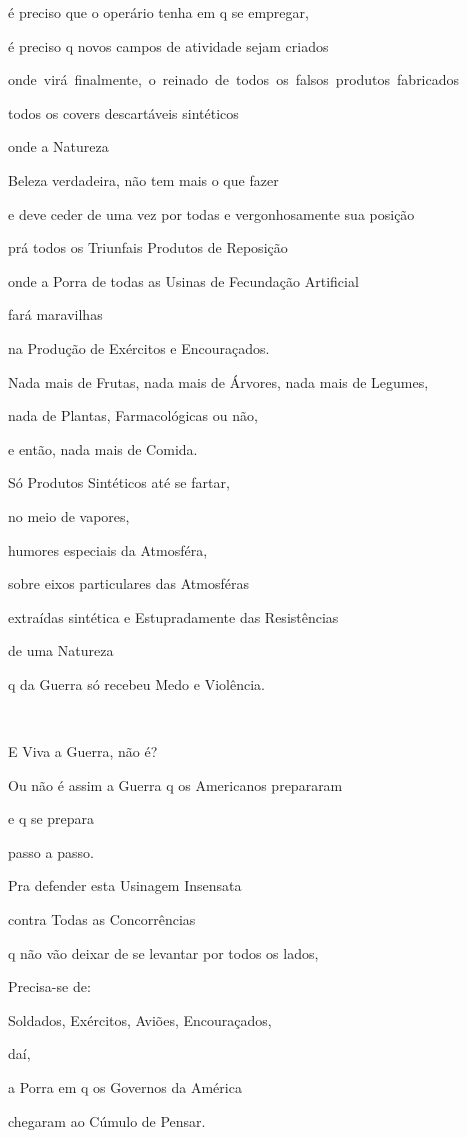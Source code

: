 é preciso que o operário tenha em q se empregar,

é preciso q novos campos de atividade sejam criados

\mbox{onde virá finalmente, o reinado de todos os falsos produtos fabricados}

todos os covers descartáveis sintéticos

onde a Natureza

Beleza verdadeira, não tem mais o que fazer

e deve ceder de uma vez por todas e vergonhosamente sua posição

prá todos os Triunfais Produtos de Reposição

onde a Porra de todas as Usinas de Fecundação Artificial

fará maravilhas

na Produção de Exércitos e Encouraçados.

Nada mais de Frutas, nada mais de Árvores, nada mais de Legumes,

nada de Plantas, Farmacológicas ou não,

e então, nada mais de Comida.

Só Produtos Sintéticos até se fartar, 

no meio de vapores,

humores especiais da Atmosféra, 

sobre eixos particulares das Atmosféras

extraídas sintética e Estupradamente das Resistências

de uma Natureza

q da Guerra só recebeu Medo e Violência.

~

E Viva a Guerra, não é?

Ou não é assim a Guerra q os Americanos prepararam

e q se prepara

passo a passo.

Pra defender esta Usinagem Insensata

contra Todas as Concorrências

q não vão deixar de se levantar por todos os lados,

Precisa-se de:

Soldados, Exércitos, Aviões, Encouraçados, 

daí,

a Porra em q os Governos da América

chegaram ao Cúmulo de Pensar.

